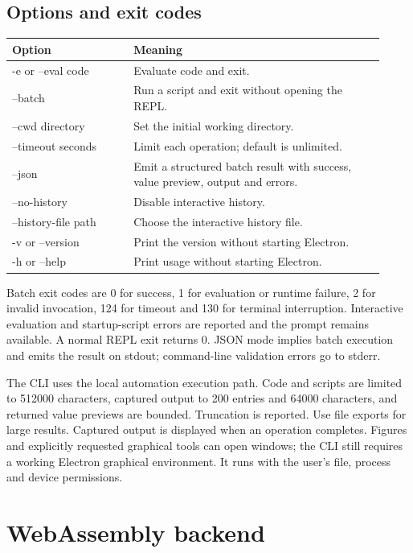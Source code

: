 \documentclass[12pt,a4paper]{article}
\begin{document}
\subsection{Options and exit codes}

\begin{longtable}{p{0.30\linewidth}p{0.62\linewidth}}
\hline
Option & Meaning \\
\hline
-e or --eval code & Evaluate code and exit. \\
--batch & Run a script and exit without opening the REPL. \\
--cwd directory & Set the initial working directory. \\
--timeout seconds & Limit each operation; default is unlimited. \\
--json & Emit a structured batch result with success, value preview, output and errors. \\
--no-history & Disable interactive history. \\
--history-file path & Choose the interactive history file. \\
-v or --version & Print the version without starting Electron. \\
-h or --help & Print usage without starting Electron. \\
\hline
\end{longtable}
Batch exit codes are 0 for success, 1 for evaluation or runtime failure, 2 for invalid invocation, 124 for timeout and 130 for terminal interruption. Interactive evaluation and startup-script errors are reported and the prompt remains available. A normal REPL exit returns 0. JSON mode implies batch execution and emits the result on stdout; command-line validation errors go to stderr.

The CLI uses the local automation execution path. Code and scripts are limited to 512000 characters, captured output to 200 entries and 64000 characters, and returned value previews are bounded. Truncation is reported. Use file exports for large results. Captured output is displayed when an operation completes. Figures and explicitly requested graphical tools can open windows; the CLI still requires a working Electron graphical environment. It runs with the user's file, process and device permissions.




\section{WebAssembly backend}
\end{document}
